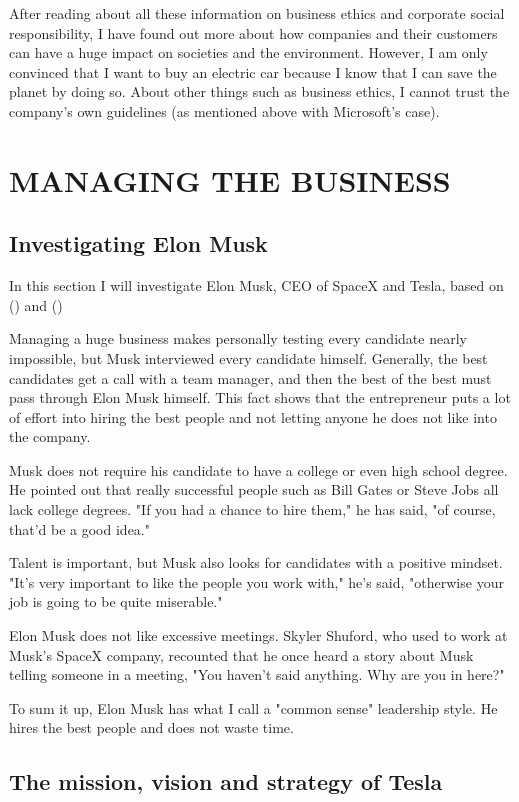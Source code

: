 \documentclass[12pt]{article}
\begin{document}
After reading about all these information on business ethics and corporate social responsibility, I have found out more about how companies and their customers can have a huge impact on societies and the environment. However, I am only convinced that I want to buy an electric car because I know that I can save the planet by doing so. About other things such as business ethics, I cannot trust the company's own guidelines (as mentioned above with Microsoft's case).

\section{MANAGING THE BUSINESS}

\subsection{Investigating Elon Musk}

In this section I will investigate Elon Musk, CEO of SpaceX and Tesla, based on (\cite{ry17}) and (\cite{to17})

Managing a huge business makes personally testing every candidate nearly impossible, but Musk interviewed every candidate himself. Generally, the best candidates get a call with a team manager, and then the best of the best must pass through Elon Musk himself. This fact shows that the entrepreneur puts a lot of effort into hiring the best people and not letting anyone he does not like into the company.

Musk does not require his candidate to have a college or even high school degree. He pointed out that really successful people such as Bill Gates or Steve Jobs all lack college degrees. "If you had a chance to hire them," he has said, "of course, that'd be a good idea."

Talent is important, but Musk also looks for candidates with a positive mindset. "It's very important to like the people you work with," he's said, "otherwise your job is going to be quite miserable."

Elon Musk does not like excessive meetings. Skyler Shuford, who used to work at Musk's SpaceX company, recounted that he once heard a story about Musk telling someone in a meeting, "You haven't said anything. Why are you in here?"

To sum it up, Elon Musk has what I call a "common sense" leadership style. He hires the best people and does not waste time.

\subsection{The mission, vision and strategy of Tesla}
\end{document}
